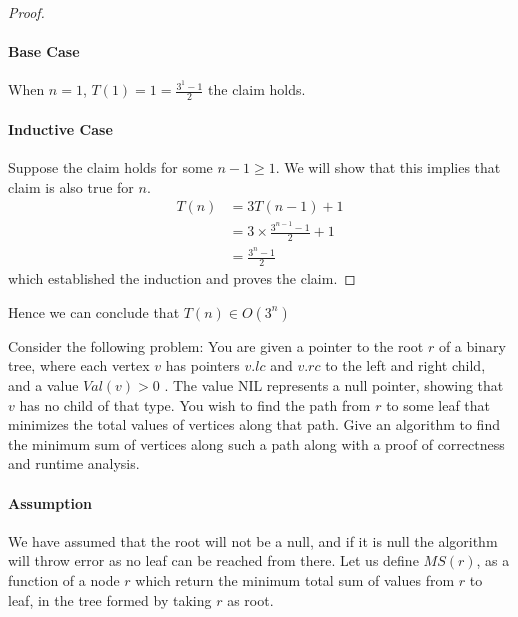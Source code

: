 \documentclass[answers]{exam}
\begin{document}
\begin{questions}
\begin{solution}
\begin{proof}
\paragraph{Base Case} When $n=1$, $T(1) = 1 = \frac{3^1 - 1}{2}$ the claim holds.
\paragraph{Inductive Case} Suppose the claim holds for some $n-1 \geq 1$. We will show that this implies that claim is also true for $n$.
\begin{align*}
    T(n) &= 3T(n-1) + 1\\
         &= 3 \times \frac{3^{n - 1} - 1}{2} + 1\\
         &= \frac{3^{n} - 1}{2}
\end{align*}
which established the induction and proves the claim.
\end{proof}
Hence we can conclude that $T(n) \in O(3^n)$
\end{solution}



\vspace{0.3in}






\question[20]
Consider the following problem:  You are given a pointer to the root $r$ of a binary tree, where each vertex $v$
has pointers $v.lc$ and $v.rc$ to the left and right child, and a value $Val(v) > 0$ .  The value NIL represents
a null pointer, showing that $v$ has no child of that type.
You wish to find the path from $r$ to some leaf that minimizes the total values of vertices along that path. Give an algorithm to find the minimum sum of vertices along such a path along with a proof of correctness and runtime analysis.

\begin{solution}

\paragraph{Assumption} We have assumed that the root will not be a null, and if it is null the algorithm will throw error as no leaf can be reached from there.
Let us define $MS(r)$, as a function of a node $r$ which return the minimum total sum of values from $r$ to leaf, in the tree formed by taking $r$ as root. 



\end{solution}
\end{questions}
\end{document}
